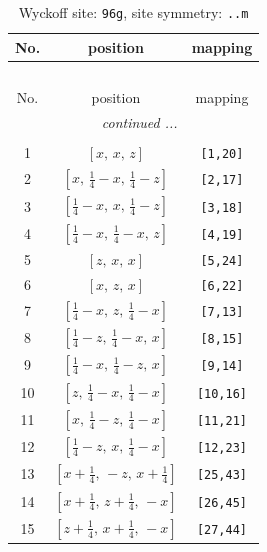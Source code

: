 \documentclass[fleqn,8pt]{jsarticle}
\begin{document}
\begin{longtable}{ccc}
\caption{Wyckoff site: {\tt 96g}, site symmetry: {\tt ..m}}
 \\
 \hline \hline
No. & position & mapping \\ \hline \endfirsthead

\multicolumn{2}{l}{\tablename\ \thetable{}} \\
 \hline \hline
No. & position & mapping \\ \hline \endhead

 \hline \hline
\multicolumn{2}{r}{\footnotesize\it continued ...} \\ \endfoot

 \hline \hline
\multicolumn{2}{r}{} \\ \endlastfoot

1 & $\left[ x,\, x,\, z \right]$ & {\tt [1,20]} \\ \hline
2 & $\left[ x,\, \frac{1}{4} - x,\, \frac{1}{4} - z \right]$ & {\tt [2,17]} \\ \hline
3 & $\left[ \frac{1}{4} - x,\, x,\, \frac{1}{4} - z \right]$ & {\tt [3,18]} \\ \hline
4 & $\left[ \frac{1}{4} - x,\, \frac{1}{4} - x,\, z \right]$ & {\tt [4,19]} \\ \hline
5 & $\left[ z,\, x,\, x \right]$ & {\tt [5,24]} \\ \hline
6 & $\left[ x,\, z,\, x \right]$ & {\tt [6,22]} \\ \hline
7 & $\left[ \frac{1}{4} - x,\, z,\, \frac{1}{4} - x \right]$ & {\tt [7,13]} \\ \hline
8 & $\left[ \frac{1}{4} - z,\, \frac{1}{4} - x,\, x \right]$ & {\tt [8,15]} \\ \hline
9 & $\left[ \frac{1}{4} - x,\, \frac{1}{4} - z,\, x \right]$ & {\tt [9,14]} \\ \hline
10 & $\left[ z,\, \frac{1}{4} - x,\, \frac{1}{4} - x \right]$ & {\tt [10,16]} \\ \hline
11 & $\left[ x,\, \frac{1}{4} - z,\, \frac{1}{4} - x \right]$ & {\tt [11,21]} \\ \hline
12 & $\left[ \frac{1}{4} - z,\, x,\, \frac{1}{4} - x \right]$ & {\tt [12,23]} \\ \hline
13 & $\left[ x + \frac{1}{4},\, - z,\, x + \frac{1}{4} \right]$ & {\tt [25,43]} \\ \hline
14 & $\left[ x + \frac{1}{4},\, z + \frac{1}{4},\, - x \right]$ & {\tt [26,45]} \\ \hline
15 & $\left[ z + \frac{1}{4},\, x + \frac{1}{4},\, - x \right]$ & {\tt [27,44]} \\ \hline

\end{longtable}
\end{document}
